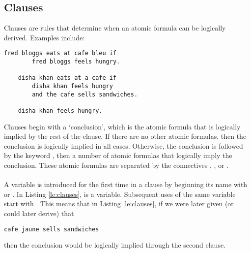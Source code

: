 \documentclass[../main.tex]{subfiles}
\begin{document}
\subsection{Clauses}
\label{section:le-clauses-one}
Clauses are rules that determine when an atomic formula can be logically derived. Examples include:
\newpage
\begin{lstlisting}[language={LE},label={le:clauses},caption={Examples of clauses in Logical English.}]
    fred bloggs eats at cafe bleu if
        fred bloggs feels hungry.

    disha khan eats at a cafe if
        disha khan feels hungry
        and the cafe sells sandwiches.

    disha khan feels hungry.
\end{lstlisting}
Clauses begin with a `conclusion', which is the atomic formula that is logically implied by the rest of the clause. If there are no other atomic formulas, then the conclusion is logically implied in all cases. Otherwise, the conclusion is followed by the keyword , then a number of atomic formulas that logically imply the conclusion. These atomic formulas are separated by the connectives , , or .
\\
\\
A variable is introduced for the first time in a clause by beginning its name with  or . In Listing \ref{le:clauses},  is a variable. Subsequent uses of the same variable start with . This means that in Listing \ref{le:clauses}, if we were later given (or could later derive) that
\begin{lstlisting}[language={LE}]
    cafe jaune sells sandwiches
\end{lstlisting}
then the conclusion  would be logically implied through the second clause. 
\end{document}
